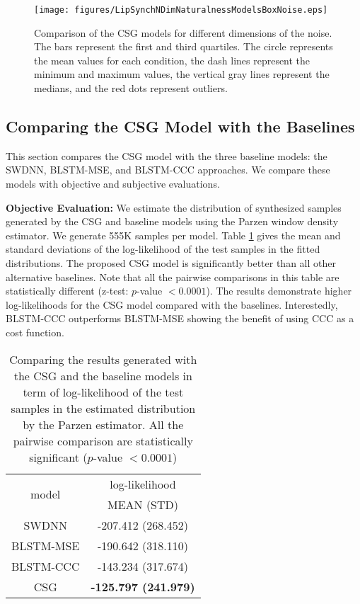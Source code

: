 \documentclass[10pt,journal,compsoc]{IEEEtran}
\begin{document}
\begin{figure}
	\centering
	\texttt{[image: figures/LipSynchNDimNaturalnessModelsBoxNoise.eps]}
	\caption{Comparison of the CSG models for different dimensions of the noise. The bars represent the first and third quartiles. The circle represents the mean values for each condition, the dash lines represent the minimum and maximum values, the vertical gray lines represent the medians, and the red dots represent outliers.}
	\label{fig:ndselect}
\end{figure}

\subsection{Comparing the CSG Model with the Baselines}
\label{ssec:csgbase}

This section compares the CSG model with the three baseline models: the SWDNN, BLSTM-MSE, and BLSTM-CCC approaches. We compare these models with objective and subjective evaluations.

\noindent
\textbf{Objective Evaluation:}
We estimate the distribution of synthesized samples generated by the CSG and baseline models using the Parzen window density estimator. We generate 555K samples per model. Table \ref{tab:ll} gives the mean and standard deviations of the log-likelihood of the test samples in the fitted distributions. The proposed CSG model is significantly better than all other alternative baselines. Note that all the pairwise comparisons in this table are statistically different (z-test: $p$-value $<0.0001$). The results demonstrate higher log-likelihoods for the CSG model compared with the baselines. Interestedly, BLSTM-CCC outperforms BLSTM-MSE showing the benefit of using CCC as a cost function.

\begin{table}[t]
	\centering
	\caption{Comparing the results generated with the CSG and the baseline models in term of log-likelihood of the test samples in the estimated distribution by the Parzen estimator. All the pairwise comparison are statistically significant ($p$-value $<0.0001$)}
	\begin{tabular}{ c| c}
		\hline
		\multirow{2}{*}{model} & log-likelihood\\
		& MEAN (STD)\\
		\hline\hline
		SWDNN & -207.412 (268.452) \\
		BLSTM-MSE & -190.642 (318.110) \\
		BLSTM-CCC & -143.234	(317.674) \\
		CSG & \textbf{-125.797 (241.979)}\\
		\hline
	\end{tabular}
	\label{tab:ll}
\end{table}
\end{document}

